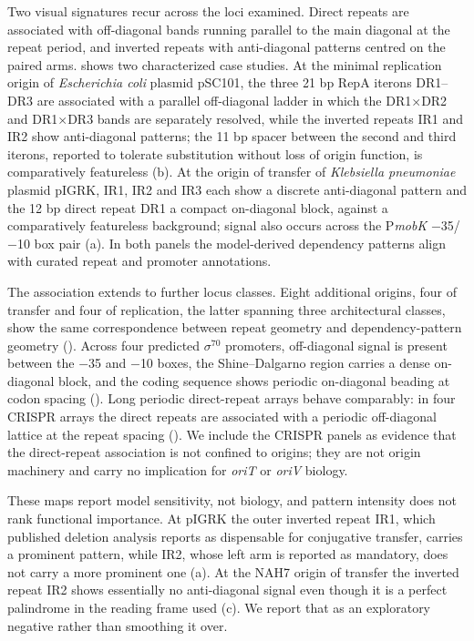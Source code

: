 Two visual signatures recur across the loci examined. Direct repeats are
associated with off-diagonal bands running parallel to the main diagonal at
the repeat period, and inverted repeats with anti-diagonal patterns centred on
the paired arms.  shows two characterized case
studies. At the minimal replication origin of \emph{Escherichia coli} plasmid
pSC101, the three 21 bp RepA iterons DR1--DR3 are associated with a parallel
off-diagonal ladder in which the DR1$\times$DR2 and DR1$\times$DR3 bands are
separately resolved, while the inverted repeats IR1 and IR2 show
anti-diagonal patterns; the 11 bp spacer between the second and third iterons,
reported to tolerate substitution without loss of origin function, is
comparatively featureless (b). At the origin of
transfer of \emph{Klebsiella pneumoniae} plasmid pIGRK, IR1, IR2 and IR3 each
show a discrete anti-diagonal pattern and the 12 bp direct repeat DR1 a
compact on-diagonal block, against a comparatively featureless background;
signal also occurs across the P\emph{mobK} $-$35/$-$10 box pair
(a). In both panels the model-derived dependency
patterns align with curated repeat and promoter annotations.

The association extends to further locus classes. Eight additional origins,
four of transfer and four of replication, the latter spanning three
architectural classes, show the same correspondence between repeat geometry and
dependency-pattern geometry
(). Across four predicted
$\sigma^{70}$ promoters, off-diagonal signal is present between the $-$35 and
$-$10 boxes, the Shine--Dalgarno region carries a dense on-diagonal block, and
the coding sequence shows periodic on-diagonal beading at codon spacing
(). Long periodic direct-repeat arrays behave
comparably: in four CRISPR arrays the direct repeats are associated with a
periodic off-diagonal lattice at the repeat spacing
(). We include the CRISPR panels as evidence that
the direct-repeat association is not confined to origins; they are not origin
machinery and carry no implication for \emph{oriT} or \emph{oriV} biology.

These maps report model sensitivity, not biology, and pattern intensity does
not rank functional importance. At pIGRK the outer inverted repeat IR1, which
published deletion analysis reports as dispensable for conjugative transfer,
carries a prominent pattern, while IR2, whose left arm is reported as
mandatory, does not carry a more prominent one (a).
At the NAH7 origin of transfer the inverted repeat IR2 shows essentially no
anti-diagonal signal even though it is a perfect palindrome in the reading
frame used (c). We report that as an exploratory
negative rather than smoothing it over.

